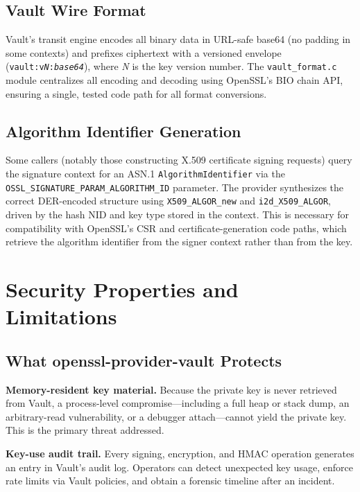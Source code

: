 \documentclass[sigconf,10pt]{acmart}
\begin{document}
\subsection{Vault Wire Format}

Vault's transit engine encodes all binary data in URL-safe base64 (no
padding in some contexts) and prefixes ciphertext with a versioned envelope
(\texttt{vault:v\emph{N}:\emph{base64}}), where \emph{N} is the key
version number.  The \texttt{vault\_format.c} module
centralizes all encoding and decoding using OpenSSL's BIO chain API, ensuring
a single, tested code path for all format conversions.

\subsection{Algorithm Identifier Generation}

Some callers (notably those constructing X.509 certificate signing requests)
query the signature context for an ASN.1 \texttt{AlgorithmIdentifier} via
the \texttt{OSSL\_SIGNATURE\_PARAM\_ALGORITHM\_ID} parameter.  The provider
synthesizes the correct DER-encoded structure using \texttt{X509\_ALGOR\_new}
and \texttt{i2d\_X509\_ALGOR}, driven by the hash NID and key type stored in
the context.  This is necessary for compatibility with OpenSSL's CSR and
certificate-generation code paths, which retrieve the algorithm identifier
from the signer context rather than from the key.

\section{Security Properties and Limitations}
\label{sec:security}

\subsection{What openssl-provider-vault Protects}

\textbf{Memory-resident key material.}  Because the private key is never
retrieved from Vault, a process-level compromise---including a full heap or
stack dump, an arbitrary-read vulnerability, or a debugger attach---cannot
yield the private key.  This is the primary threat addressed.

\textbf{Key-use audit trail.}  Every signing, encryption, and HMAC operation
generates an entry in Vault's audit log.  Operators can detect unexpected
key usage, enforce rate limits via Vault policies, and obtain a forensic
timeline after an incident.
\end{document}
